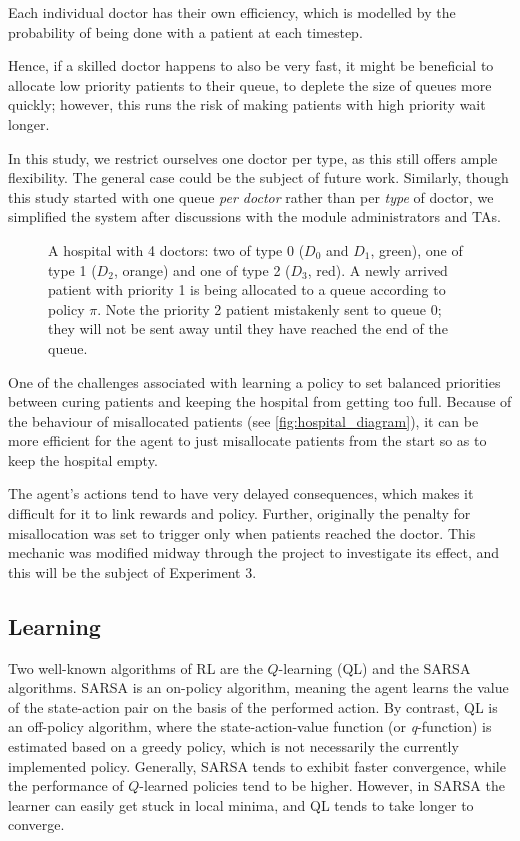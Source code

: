\documentclass[11point]{article}
\begin{document}
Each individual doctor has their own efficiency, which is modelled by the probability of being done with a patient at each timestep.

Hence, if a skilled doctor happens to also be very fast, it might be beneficial to allocate low priority patients to their queue, to deplete the size of queues more quickly;
however, this runs the risk of making patients with high priority wait longer.

In this study, we restrict ourselves one doctor per type, as this still offers ample flexibility. The general case could be the subject of future work.
Similarly, though this study started with one queue \emph{per doctor} rather than per \emph{type} of doctor, we simplified the system after discussions with the module administrators and TAs.

\begin{figure}
  \centering
    \begin{adjustwidth}{-0.2cm}{}
    \resizebox{\columnwidth}{!}{%
        
    }
    \end{adjustwidth}
    \caption{A hospital with 4 doctors: two of type 0 ($D_0$ and $D_1$, green), one of type 1 ($D_2$, orange) and one of type 2 ($D_3$, red). A newly arrived patient with priority 1 is being allocated to a queue according to policy $\pi$.
    Note the priority 2 patient mistakenly sent to queue 0; they will not be sent away until they have reached the end of the queue.}
    \label{fig:hospital_diagram}
\end{figure}

One of the challenges associated with learning a policy to set balanced priorities between curing patients and keeping the hospital from getting too full.
Because of the behaviour of misallocated patients (see \autoref{fig:hospital_diagram}), it can be more efficient for the agent to just misallocate patients from the start so as to keep the hospital empty.

The agent's actions tend to have very delayed consequences, which makes it difficult for it to link rewards and policy.
Further, originally the penalty for misallocation was set to trigger only when patients reached the doctor.
This mechanic was modified midway through the project to investigate its effect, and this will be the subject of Experiment 3.

\subsection{Learning}
Two well-known algorithms of RL are the $Q$-learning (QL) and the SARSA algorithms. \cite{sutton2018reinforcement}
SARSA is an on-policy algorithm,
meaning the agent learns the value of the state-action pair on the basis of the performed action.
By contrast, QL is an off-policy algorithm, where the state-action-value function (or \textit{q}-function) is estimated based on a greedy policy, which is not necessarily the currently implemented policy.
Generally, SARSA tends to exhibit faster convergence, while the performance of $Q$-learned policies tend to be higher. 
However, in SARSA the learner can easily get stuck in local minima, and QL tends to take longer to converge.
\end{document}

